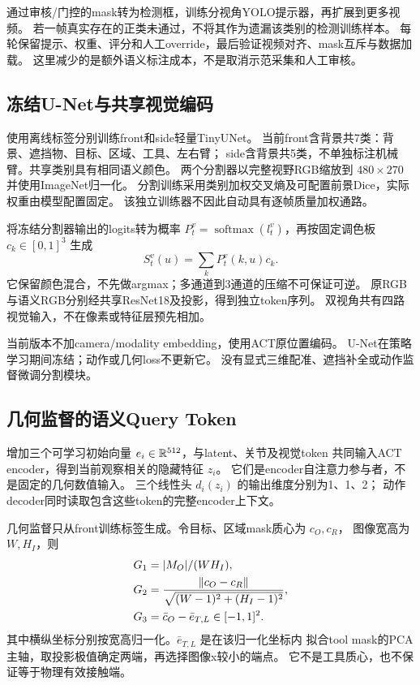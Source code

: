 通过审核/门控的mask转为检测框，训练分视角YOLO提示器，再扩展到更多视频。
若一帧真实存在的正类未通过，不将其作为遗漏该类别的检测训练样本。
每轮保留提示、权重、评分和人工override，最后验证视频对齐、mask互斥与数据加载。
这里减少的是额外语义标注成本，不是取消示范采集和人工审核。

\subsection{冻结U-Net与共享视觉编码}

使用离线标签分别训练front和side轻量TinyUNet。
当前front含背景共7类：背景、遮挡物、目标、区域、工具、左右臂；
side含背景共5类，不单独标注机械臂。共享类别具有相同语义颜色。
两个分割器以完整视野RGB缩放到 $480\times270$ 并使用ImageNet归一化。
分割训练采用类别加权交叉熵及可配置前景Dice，实际权重由模型配置固定。
该独立训练器不因此自动具有逐帧质量加权通路。

将冻结分割器输出的logits转为概率
$P_t^v=\operatorname{softmax}(l_t^v)$，再按固定调色板
$c_k\in[0,1]^3$ 生成
\begin{equation}
 S_t^v(u)=\sum_k P_t^v(k,u)c_k.
 \label{eq:semantic_rgb}
\end{equation}
它保留颜色混合，不先做argmax；多通道到3通道的压缩不可保证可逆。
原RGB与语义RGB分别经共享ResNet18及投影，得到独立token序列。
双视角共有四路视觉输入，不在像素或特征层预先相加。

当前版本不加camera/modality embedding，使用ACT原位置编码。
U-Net在策略学习期间冻结；动作或几何loss不更新它。
没有显式三维配准、遮挡补全或动作监督微调分割模块。

\subsection{几何监督的语义Query Token}

增加三个可学习初始向量 $e_i\in\mathbb{R}^{512}$，与latent、关节及视觉token
共同输入ACT encoder，得到当前观察相关的隐藏特征 $z_i$。
它们是encoder自注意力参与者，不是固定的几何数值输入。
三个线性头 $d_i(z_i)$ 的输出维度分别为1、1、2；
动作decoder同时读取包含这些token的完整encoder上下文。

几何监督只从front训练标签生成。令目标、区域mask质心为 $c_O,c_R$，
图像宽高为 $W,H_I$，则
\begin{align}
 G_1&=|M_O|/(WH_I),\nonumber\\
 G_2&=\frac{\lVert c_O-c_R\rVert}{\sqrt{(W-1)^2+(H_I-1)^2}},\nonumber\\
 G_3&=\bar c_O-\bar e_{T,L}\in[-1,1]^2.
 \label{eq:geometry_targets}
\end{align}
其中横纵坐标分别按宽高归一化。$\bar e_{T,L}$ 是在该归一化坐标内
拟合tool mask的PCA主轴，取投影极值确定两端，再选择图像x较小的端点。
它不是工具质心，也不保证等于物理有效接触端。

